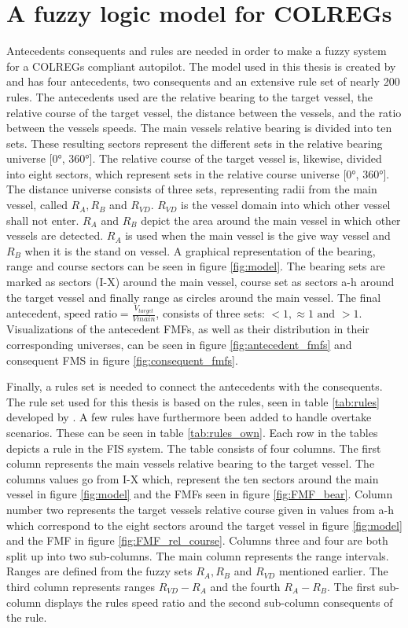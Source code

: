 \section{A fuzzy logic model for COLREGs}
\label{section:model}
Antecedents consequents and rules are needed in order to make a fuzzy system for a COLREGs compliant autopilot. The model used in this thesis is created by \textcite{perera2012intelligent} and has four antecedents, two consequents and an extensive rule set of nearly 200 rules. The antecedents used are the relative bearing to the target vessel, the relative course of the target vessel, the distance between the vessels, and the ratio between the vessels speeds. The main vessels relative bearing is divided into ten sets. These resulting sectors represent the different sets in the relative bearing universe [\ang{0}, \ang{360}]. The relative course of the target vessel is, likewise, divided into eight sectors, which represent sets in the relative course universe [\ang{0}, \ang{360}]. The distance universe consists of three sets, representing radii from the main vessel, called $R_A, R_B$ and $R_{VD}$. $R_{VD}$ is the vessel domain into which other vessel shall not enter. $R_A$ and $R_B$ depict the area around the main vessel in which other vessels are detected. $R_A$ is used when the main vessel is the give way vessel and $R_B$ when it is the stand on vessel. A graphical representation of the bearing, range and course sectors can be seen in figure \ref{fig:model}. The bearing sets are marked as sectors (I-X) around the main vessel, course set as sectors a-h around the target vessel and finally range as circles around the main vessel. The final antecedent, $\text{speed ratio} =\frac{V_{target}}{V{main}}$, consists of three sets: $<1, \approx1 \text{ and } >1$.
Visualizations of the antecedent FMFs, as well as their distribution in their corresponding universes, can be seen in figure \ref{fig:antecedent_fmfs} and consequent FMS in figure \ref{fig:consequent_fmfs}.

Finally, a rules set is needed to connect the antecedents with the consequents. The rule set used for this thesis is based on the rules, seen in table \ref{tab:rules} developed by \textcite{perera2012intelligent}. A few rules have furthermore been added to handle overtake scenarios. These can be seen in table \ref{tab:rules_own}.
Each row in the tables depicts a rule in the FIS system.
The table consists of four columns. The first column represents the main vessels relative bearing to the target vessel. The columns values go from I-X which, represent the ten sectors around the main vessel in figure \ref{fig:model} and the FMFs seen in figure \ref{fig:FMF_bear}. Column number two represents the target vessels relative course given in values from a-h which correspond to the eight sectors around the target vessel in figure \ref{fig:model} and the FMF in figure \ref{fig:FMF_rel_course}. Columns three and four are both split up into two sub-columns. The main column represents the range intervals. Ranges are defined from the fuzzy sets $R_A, R_B$ and $R_{VD}$ mentioned earlier. The third column represents ranges $R_{VD}- R_A$ and the fourth $R_A-R_B$. The first sub-column displays the rules speed ratio and the second sub-column consequents of the rule.

